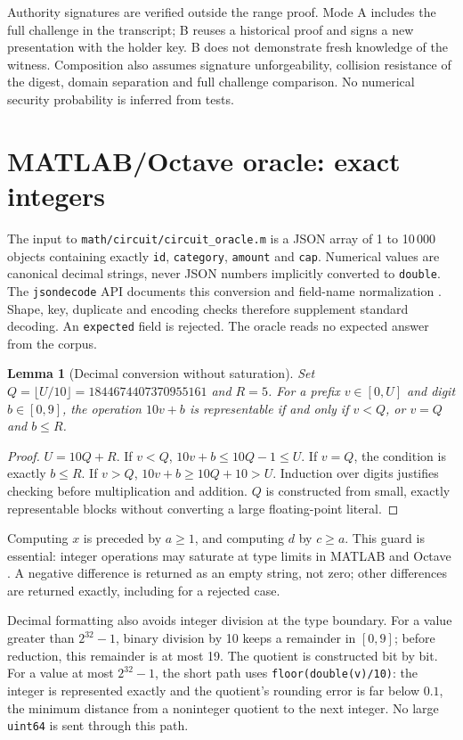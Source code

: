 \documentclass[11pt,a4paper]{article}
\newtheorem{lemma}[theorem]{Lemma}
\newcommand{\code}[1]{\nolinkurl{#1}}
\begin{document}
Authority signatures are verified outside the range proof. Mode A
includes the full challenge in the transcript; B reuses a historical
proof and signs a new presentation with the holder key.
B does not demonstrate fresh knowledge of the witness. Composition also
assumes signature unforgeability, collision resistance of the digest,
domain separation and full challenge comparison.
No numerical security probability is inferred from tests.

\section{MATLAB/Octave oracle: exact integers}
The input to \code{math/circuit/circuit_oracle.m} is a JSON array of
1 to 10\,000 objects containing exactly \code{id}, \code{category},
\code{amount} and \code{cap}. Numerical values are canonical decimal
strings, never JSON numbers implicitly converted to \code{double}.
The \code{jsondecode} API documents this conversion and field-name
normalization \cite{matlabjson}. Shape, key, duplicate and encoding
checks therefore supplement standard decoding.
An \code{expected} field is rejected. The oracle reads no expected answer
from the corpus.

\begin{lemma}[Decimal conversion without saturation]
Set $Q=\lfloor U/10\rfloor=1844674407370955161$ and $R=5$.
For a prefix $v\in[0,U]$ and digit $b\in[0,9]$, the operation
$10v+b$ is representable if and only if $v<Q$, or $v=Q$ and $b\le R$.
\end{lemma}
\begin{proof}
$U=10Q+R$. If $v<Q$, $10v+b\le10Q-1\le U$. If $v=Q$, the condition
is exactly $b\le R$. If $v>Q$, $10v+b\ge10Q+10>U$.
Induction over digits justifies checking before multiplication and addition.
$Q$ is constructed from small, exactly representable blocks without
converting a large floating-point literal.
\end{proof}

Computing $x$ is preceded by $a\ge1$, and computing $d$ by $c\ge a$.
This guard is essential: integer operations may saturate at type limits
in MATLAB and Octave \cite{matlabintegers,octaveintegers}.
A negative difference is returned as an empty string, not zero;
other differences are returned exactly, including for a rejected case.

Decimal formatting also avoids integer division at the type boundary.
For a value greater than $2^{32}-1$, binary division by 10 keeps a
remainder in $[0,9]$; before reduction, this remainder is at most 19.
The quotient is constructed bit by bit. For a value at most $2^{32}-1$,
the short path uses \code{floor(double(v)/10)}: the integer is represented
exactly and the quotient's rounding error is far below $0.1$, the minimum
distance from a noninteger quotient to the next integer.
No large \code{uint64} is sent through this path.
\end{document}
